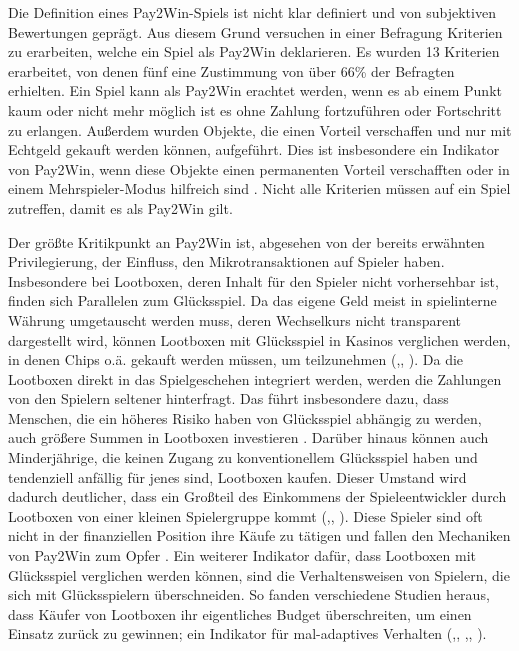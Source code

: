 \noindent Die Definition eines Pay2Win-Spiels ist nicht klar definiert und von subjektiven Bewertungen geprägt. Aus diesem Grund versuchen \cite{Tregel2020} in einer Befragung Kriterien zu erarbeiten, welche ein Spiel als Pay2Win deklarieren. Es wurden 13 Kriterien erarbeitet, von denen fünf eine Zustimmung von über 66\% der Befragten erhielten. Ein Spiel kann als Pay2Win erachtet werden, wenn es ab einem Punkt kaum oder nicht mehr möglich ist es ohne Zahlung fortzuführen oder Fortschritt zu erlangen. Außerdem wurden Objekte, die einen Vorteil verschaffen und nur mit Echtgeld gekauft werden können, aufgeführt. Dies ist insbesondere ein Indikator von Pay2Win, wenn diese Objekte einen permanenten Vorteil verschafften oder in einem Mehrspieler-Modus hilfreich sind \citep[S. 179]{Tregel2020}. Nicht alle Kriterien müssen auf ein Spiel zutreffen, damit es als Pay2Win gilt.

Der größte Kritikpunkt an Pay2Win ist, abgesehen von der bereits erwähnten Privilegierung, der Einfluss, den Mikrotransaktionen auf Spieler haben. Insbesondere bei Lootboxen, deren Inhalt für den Spieler nicht vorhersehbar ist, finden sich Parallelen zum Glücksspiel. Da das eigene Geld meist in spielinterne Währung umgetauscht werden muss, deren Wechselkurs nicht transparent dargestellt wird, können Lootboxen mit Glücksspiel in Kasinos verglichen werden, in denen Chips o.ä. gekauft werden müssen, um teilzunehmen (\cite[S. 7 ff.]{Drummond2018},, \cite[S. 185 ff.]{Nielsen2019}). Da die Lootboxen direkt in das Spielgeschehen integriert werden, werden die Zahlungen von den Spielern seltener hinterfragt. Das führt insbesondere dazu, dass Menschen, die ein höheres Risiko haben von Glücksspiel abhängig zu werden, auch größere Summen in Lootboxen investieren \citep[S. 5 f.]{Zendle2018}. Darüber hinaus können auch Minderjährige, die keinen Zugang zu konventionellem Glücksspiel haben und tendenziell anfällig für jenes sind, Lootboxen kaufen. Dieser Umstand wird dadurch deutlicher, dass ein Großteil des Einkommens der Spieleentwickler durch Lootboxen von einer kleinen Spielergruppe kommt (\cite[S. 8 f.]{Zendle2020},, \cite{Takahashi2014}). Diese Spieler sind oft nicht in der finanziellen Position ihre Käufe zu tätigen und fallen den Mechaniken von Pay2Win zum Opfer \citep{Close2021}. Ein weiterer Indikator dafür, dass Lootboxen mit Glücksspiel verglichen werden können, sind die Verhaltensweisen von Spielern, die sich mit Glücksspielern überschneiden. So fanden verschiedene Studien heraus, dass Käufer von Lootboxen ihr eigentliches Budget überschreiten, um einen Einsatz zurück zu gewinnen; ein Indikator für mal-adaptives Verhalten (\cite[S. 9 ff.]{Nielsen2019},, \cite[S. 1968 f.]{King2018a},, \cite[S. 4 f.]{Xiao2021}).


